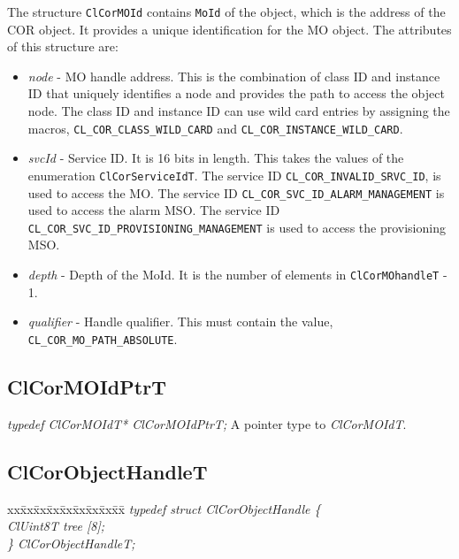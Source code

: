 \begin{flushleft}
 The structure {\tt{ClCorMOId}} contains {\tt{MoId}} of the object, which is the address of the COR object. It provides a unique
 identification for the MO object. The attributes of this structure are:
\begin{itemize}
\item
\textit{node} - MO handle address. This is the combination of class ID and instance ID that uniquely identifies a node and provides the path
to access the object node. The class ID and instance ID can use wild card entries by assigning the macros, 
{\tt{CL\_\-COR\_\-CLASS\_\-WILD\_\-CARD}} and {\tt{CL\_\-COR\_\-INSTANCE\_\-WILD\_\-CARD}}.
\item
\textit{svcId} - Service ID. It is 16 bits in length. This takes the values of the enumeration {\tt{ClCorServiceIdT}}. 
The service ID {\tt{CL\_\-COR\_\-INVALID\_\-SRVC\_\-ID}}, is used to access the MO.
The service ID {\tt{CL\_\-COR\_\-SVC\_\-ID\_\-ALARM\_\-MANAGEMENT}} is used to access the alarm MSO.
The service ID {\tt{CL\_\-COR\_\-SVC\_\-ID\_\-PROVISIONING\_\-MANAGEMENT}} is used to access the provisioning MSO.
\item
\textit{depth} - Depth of the MoId. It is the number of elements in {\tt{ClCorMOhandleT}} - 1.
\item
\textit{qualifier} - Handle qualifier. This must contain the value, {\tt{CL\_\-COR\_\-MO\_\-PATH\_\-ABSOLUTE}}.
\end{itemize}




\subsection{ClCorMOIdPtrT}
\textit{typedef ClCorMOIdT* ClCorMOIdPtrT;}
\newline
\newline
A pointer type to \textit{ClCorMOIdT}.


\subsection{ClCorObjectHandleT}
\begin{tabbing}
xx\=xx\=xx\=xx\=xx\=xx\=xx\=xx\=xx\=\kill
\textit{typedef struct ClCorObjectHandle \{ }\\
\>\>\>\>\textit{ClUint8T tree [8]; }\\
\textit{\} ClCorObjectHandleT;} \end{tabbing}


\end{flushleft}
